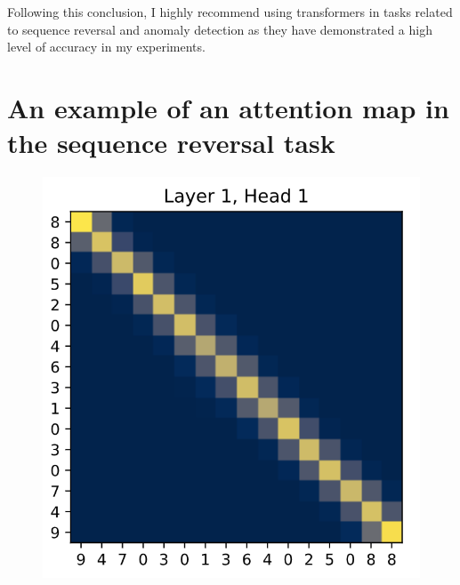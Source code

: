 \documentclass[peerreview]{IEEEtran}
\begin{document}
Following this conclusion, I highly recommend using transformers in tasks related to sequence reversal and anomaly detection as they have demonstrated a high level of accuracy in my experiments.

\newpage
\appendices
\section{An example of an attention map in the sequence reversal task} \label{App:reversal_attention_map}
\begin{figure}[!h]
\centering
\includegraphics[width=0.8\columnwidth]{reversal_attention_map} 
\end{figure}
\end{document}
